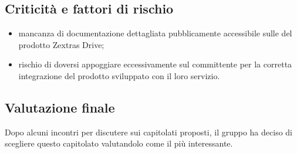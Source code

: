 \subsection{Criticità e fattori di rischio}
\begin{itemize}
\item mancanza di documentazione dettagliata pubblicamente accessibile sulle  del prodotto Zextras Drive;
\item rischio di doversi appoggiare eccessivamente sul committente per la corretta integrazione del prodotto sviluppato con il loro servizio.
\end{itemize}

\subsection{Valutazione finale}
Dopo alcuni incontri per discutere sui capitolati proposti, il gruppo \textit{\Gruppo{}} ha deciso di scegliere questo capitolato valutandolo come il più interessante.